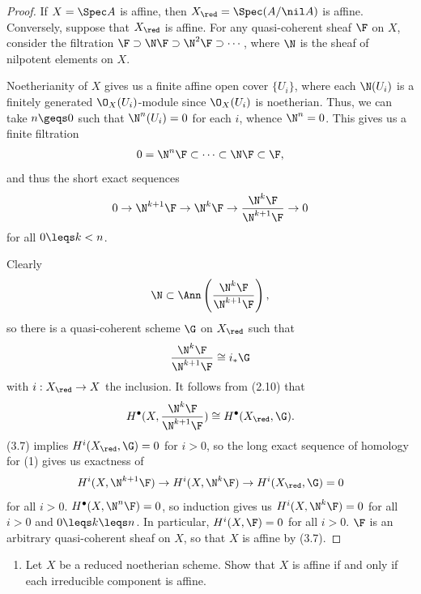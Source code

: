 \documentclass[12pt]{amsart}
\begin{document}
\begin{proof}
  If $X=\Spec A$ is affine, then $X_\red=\Spec (A/\nil A)$ is affine.
  Conversely, suppose that $X_\red$ is affine.
  For any quasi-coherent sheaf $\F$ on $X$, consider the filtration $\F\supset \N\F\supset \N^2\F\supset\cdots$, where $\N$ is the sheaf of nilpotent elements on $X$.

  Noetherianity of $X$ gives us a finite affine open cover $\{U_i\}$, where each $\N(U_i)$ is a finitely generated $\O_X(U_i)$-module since $\O_X(U_i)$ is noetherian.
  Thus, we can take $n\geqs 0$ such that $\N^n(U_i)=0$ for each $i$, whence $\N^n=0$.
  This gives us a finite filtration
  \begin{align*}
    0=\N^n\F\subset\cdots \subset \N\F\subset \F,
  \end{align*}
  and thus the short exact sequences
  \begin{equation}
    0\to \N^{k+1}\F\to\N^k\F\to \frac{\N^k\F}{\N^{k+1}\F}\to 0
  \end{equation}
  for all $0\leqs k<n$.

  Clearly 
  \[
    \N\subset \Ann \left(\frac{\N^k\F}{\N^{k+1}\F}\right),
  \] 
  so there is a quasi-coherent scheme $\G$ on $X_\red$ such that
  \[
    \frac{\N^k\F}{\N^{k+1}\F}\cong i_*\G
  \] 
  with $i:X_\red\to X$ the inclusion.
  It follows from (2.10) that
  \begin{align*}
    H^\bullet(X,\frac{\N^k\F}{\N^{k+1}\F})\cong H^\bullet(X_\red, \G).
  \end{align*}
  (3.7) implies $H^i(X_\red,\G) =0$ for $i>0$, so the long exact sequence of homology for (1) gives us exactness of
  \begin{align*}
    H^i(X,\N^{k+1}\F)\to H^i(X,\N^k\F)\to H^i(X_\red,\G)=0
  \end{align*}
  for all $i>0$.
  $H^\bullet(X,\N^n\F)=0$, so induction gives us $H^i(X,\N^k\F)=0$ for all $i>0$ and $0\leqs k\leqs n$.
  In particular, $H^i(X,\F)=0$ for all $i>0$.
  $\F$ is an arbitrary quasi-coherent sheaf on $X$, so that $X$ is affine by (3.7).
\end{proof}

\begin{enumerate}
  \item[3.2.] {
      Let $X$ be a reduced noetherian scheme.
      Show that $X$ is affine if and only if each irreducible component is affine.
    }
\end{enumerate}
\end{document}
